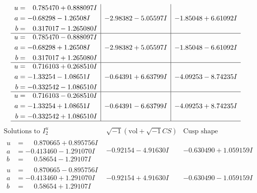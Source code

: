 \documentclass[1p]{elsarticle_modified}
\theoremstyle{definition}
\newcommand{\I}{\sqrt{-1}}
\begin{document}
$$\begin{array}{c|c|c}
\begin{aligned}
u &= \phantom{-}0.785470 + 0.888097 I \\
a &= -0.68298 - 1.26508 I \\
b &= \phantom{-}0.317017 - 1.265080 I\end{aligned}
 & -2.98382 - 5.05597 I & -1.85048 + 6.61092 I \\ \hline\begin{aligned}
u &= \phantom{-}0.785470 - 0.888097 I \\
a &= -0.68298 + 1.26508 I \\
b &= \phantom{-}0.317017 + 1.265080 I\end{aligned}
 & -2.98382 + 5.05597 I & -1.85048 - 6.61092 I \\ \hline\begin{aligned}
u &= \phantom{-}0.716103 + 0.268510 I \\
a &= -1.33254 - 1.08651 I \\
b &= -0.332542 - 1.086510 I\end{aligned}
 & -0.64391 + 6.63799 I & -4.09253 - 8.74235 I \\ \hline\begin{aligned}
u &= \phantom{-}0.716103 - 0.268510 I \\
a &= -1.33254 + 1.08651 I \\
b &= -0.332542 + 1.086510 I\end{aligned}
 & -0.64391 - 6.63799 I & -4.09253 + 8.74235 I\\
 \hline 
 \end{array}$$\newpage$$\begin{array}{c|c|c}  
\text{Solutions to }I^u_{2}& \I (\text{vol} + \sqrt{-1}CS) & \text{Cusp shape}\\
 \hline 
\begin{aligned}
u &= \phantom{-}0.870665 + 0.895756 I \\
a &= -0.413460 - 1.291070 I \\
b &= \phantom{-}0.58654 - 1.29107 I\end{aligned}
 & -0.92154 - 4.91630 I & -0.630490 + 1.059159 I \\ \hline\begin{aligned}
u &= \phantom{-}0.870665 - 0.895756 I \\
a &= -0.413460 + 1.291070 I \\
b &= \phantom{-}0.58654 + 1.29107 I\end{aligned}
 & -0.92154 + 4.91630 I & -0.630490 - 1.059159 I \\ \hline\begin{aligned}

\end{aligned}
\end{array}$$
\end{document}

